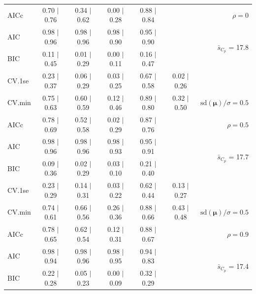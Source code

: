 \documentclass[12pt]{article}
\newcommand{\mr}[1]{\mathrm{#1}}
\newcommand{\bm}[1]{\mathbf{#1}}
\begin{document}
\begin{table}[p]
\begin{center}
\begin{tabular}{l*{5}{c}|r}
AICc & 0.70 $\mid$ 0.76 & 0.34 $\mid$ 0.62 & 0.00 $\mid$ 0.28 & 0.88 $\mid$ 0.84 & & $\rho=0$ \\
AIC & 0.98 $\mid$ 0.96 & 0.98 $\mid$ 0.96 & 0.98 $\mid$ 0.90 & 0.95 $\mid$ 0.90 & & \multirow{2}{*}{$\bar{s}_{C_p}$ = 17.8} \\
BIC & 0.11 $\mid$ 0.45 & 0.01 $\mid$ 0.29 & 0.00 $\mid$ 0.11 & 0.16 $\mid$ 0.47 & & \\
 \hline 
CV.1se & 0.23 $\mid$ 0.37 & 0.06 $\mid$ 0.29 & 0.03 $\mid$ 0.25 & 0.67 $\mid$ 0.58 & 0.02 $\mid$ 0.26 &\\
CV.min & 0.75 $\mid$ 0.63 & 0.60 $\mid$ 0.59 & 0.12 $\mid$ 0.46 & 0.89 $\mid$ 0.80 & 0.32 $\mid$ 0.50 &  $\mr{sd}(\bm{\mu})/\sigma=0.5$ \\
AICc & 0.78 $\mid$ 0.69 & 0.52 $\mid$ 0.58 & 0.02 $\mid$ 0.29 & 0.87 $\mid$ 0.76 & & $\rho=0.5$ \\
AIC & 0.98 $\mid$ 0.96 & 0.98 $\mid$ 0.96 & 0.98 $\mid$ 0.93 & 0.95 $\mid$ 0.91 & & \multirow{2}{*}{$\bar{s}_{C_p}$ = 17.7} \\
BIC & 0.09 $\mid$ 0.36 & 0.02 $\mid$ 0.29 & 0.03 $\mid$ 0.10 & 0.21 $\mid$ 0.40 & & \\
 \hline 
CV.1se & 0.23 $\mid$ 0.29 & 0.14 $\mid$ 0.31 & 0.03 $\mid$ 0.22 & 0.62 $\mid$ 0.44 & 0.13 $\mid$ 0.27 &\\
CV.min & 0.74 $\mid$ 0.61 & 0.66 $\mid$ 0.56 & 0.26 $\mid$ 0.36 & 0.88 $\mid$ 0.66 & 0.43 $\mid$ 0.48 &  $\mr{sd}(\bm{\mu})/\sigma=0.5$ \\
AICc & 0.78 $\mid$ 0.65 & 0.62 $\mid$ 0.54 & 0.12 $\mid$ 0.31 & 0.88 $\mid$ 0.67 & & $\rho=0.9$ \\
AIC & 0.98 $\mid$ 0.94 & 0.98 $\mid$ 0.96 & 0.98 $\mid$ 0.95 & 0.94 $\mid$ 0.83 & & \multirow{2}{*}{$\bar{s}_{C_p}$ = 17.4} \\
BIC & 0.22 $\mid$ 0.28 & 0.05 $\mid$ 0.23 & 0.00 $\mid$ 0.09 & 0.32 $\mid$ 0.29 & & \\
 \hline
 \end{tabular}
\end{center}
\vspace{-1cm}
\end{table}
\end{document}
